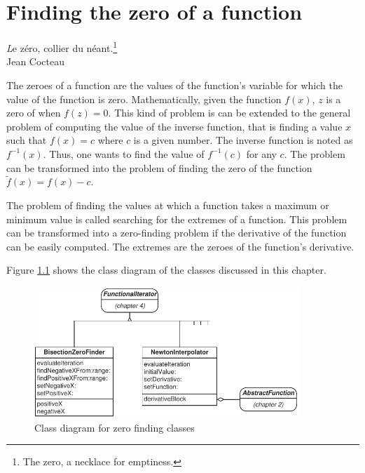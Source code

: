 %
%

\chapter{Finding the zero of a function}
\label{ch:zeroes} \vspace{1 ex}
\begin{flushright} {\textsl Le z\'ero, collier du n\'eant.}\footnote{The zero, a necklace for emptiness.}\\ Jean Cocteau
\end{flushright}
\vspace{1 ex}
The zeroes of a function are the values of the
function's variable for which the value of the function is zero.
Mathematically, given the function $f\left(x\right)$, $z$ is a
zero of when $f\left(z\right)=0$. This kind of problem is can be
extended to the general problem of computing the value of the
inverse function, that is finding a value $x$ such that
$f\left(x\right)=c$ where $c$ is a given number. The inverse
function is noted as $f^{-1}\left(x\right)$. Thus, one wants to
find the value of $f^{-1}\left(c\right)$ for any $c$. The problem
can be transformed into the problem of finding the zero of the
function $\tilde{f}\left(x\right)=f\left(x\right)-c$.

The problem of finding the values at which a function takes a
maximum or minimum value is called searching for the extremes of a
function. This problem can be transformed into a zero-finding
problem if the derivative of the function can be easily computed.
The extremes are the zeroes of the function's derivative.

\noindent Figure \ref{cl:zeroFinding} shows the class diagram of
the classes discussed in this chapter.
\begin{figure}
\centering\includegraphics[width=10cm]{Figures/ZeroClassDiagram}
\caption{Class diagram for zero finding
classes}\label{cl:zeroFinding}
\end{figure}


